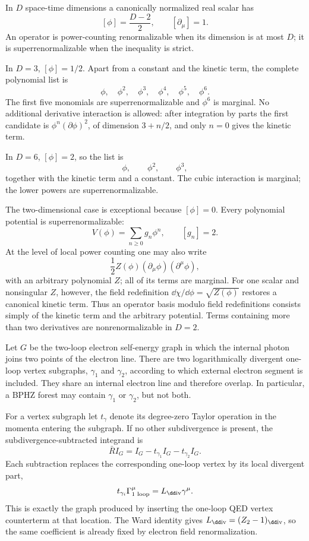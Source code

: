 \ExerciseEditorialNote

\begin{enumerate}
In \(D\) space-time dimensions a canonically normalized real scalar has
\[
 [\phi]=\frac{D-2}{2},\qquad [\partial_\mu]=1.
\]
An operator is power-counting renormalizable when its dimension is at most
\(D\); it is superrenormalizable when the inequality is strict.

In \(D=3\), \([\phi]=1/2\).  Apart from a constant and the kinetic term, the
complete polynomial list is
\[
 \phi,\quad \phi^2,\quad\phi^3,\quad\phi^4,\quad\phi^5,\quad\phi^6.
\]
The first five monomials are superrenormalizable and \(\phi^6\) is
marginal.  No additional derivative interaction is allowed: after
integration by parts the first candidate is
\(\phi^n(\partial\phi)^2\), of dimension \(3+n/2\), and only \(n=0\)
gives the kinetic term.

In \(D=6\), \([\phi]=2\), so the list is
\[
 \phi,\qquad \phi^2,\qquad \phi^3,
\]
together with the kinetic term and a constant.  The cubic interaction is
marginal; the lower powers are superrenormalizable.

The two-dimensional case is exceptional because \([\phi]=0\).  Every
polynomial potential is superrenormalizable:
\[
 V(\phi)=\sum_{n\geq0}g_n\phi^n,\qquad [g_n]=2.
\]
At the level of local power counting one may also write
\[
 \frac12 Z(\phi)(\partial_\mu\phi)(\partial^\mu\phi),
\]
with an arbitrary polynomial \(Z\); all of its terms are marginal.  For one
scalar and nonsingular \(Z\), however, the field redefinition
\(\dd\chi/\dd\phi=\sqrt{Z(\phi)}\) restores a canonical kinetic term.  Thus an
operator basis modulo field redefinitions consists simply of the kinetic
term and the arbitrary potential.  Terms containing more than two
derivatives are nonrenormalizable in \(D=2\).

Let \(G\) be the two-loop electron self-energy graph in which the internal
photon joins two points of the electron line.  There are two logarithmically
divergent one-loop vertex subgraphs, \(\gamma_1\) and \(\gamma_2\), according
to which external electron segment is included.  They share an internal
electron line and therefore overlap.  In particular, a BPHZ forest may
contain \(\gamma_1\) or \(\gamma_2\), but not both.

For a vertex subgraph let \(t_\gamma\) denote its degree-zero Taylor
operation in the momenta entering the subgraph.  If no other subdivergence is
present, the subdivergence-subtracted integrand is
\[
 \bar R I_G=I_G-t_{\gamma_1}I_G-t_{\gamma_2}I_G.
\]
Each subtraction replaces the corresponding one-loop vertex by its local
divergent part,
\[
 t_{\gamma_i}\Gamma^\mu_{\text{1 loop}}
   =L_{\rm \dd iv}\gamma^\mu .
\]
This is exactly the graph produced by inserting the one-loop QED vertex
counterterm at that location.  The Ward identity gives
\(L_{\rm \dd iv}=(Z_2-1)_{\rm \dd iv}\), so the same coefficient is already fixed
by electron field renormalization.


\end{enumerate}
